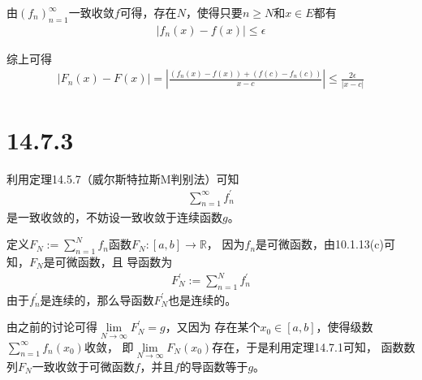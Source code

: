 \documentclass{article}
\begin{document}
由$(f_n)_{n = 1}^\infty$一致收敛$f$可得，存在$N$，使得只要$n \geq N$和$x \in E$都有
\begin{align*}
  |f_n(x) - f(x)| \leq \epsilon
\end{align*}

综上可得
\begin{align*}
 |F_n(x) - F(x)| = |\frac{(f_n(x) - f(x)) + (f(c) - f_n(c))}{x - c}| \leq \frac{2\epsilon}{|x - c|}  
\end{align*}


\section*{14.7.3}

利用定理14.5.7（威尔斯特拉斯M判别法）可知
\begin{align*}
  \sum \limits_{n = 1}^\infty f_n^\prime
\end{align*}
是一致收敛的，不妨设一致收敛于连续函数$g$。

定义$F_N := \sum\limits_{n = 1}^N f_n$函数$F_N: [a, b] \to \mathbb{R}$，
因为$f_n$是可微函数，由10.1.13(c)可知，$F_N$是可微函数，且
导函数为
\begin{align*}
  F_N^\prime := \sum\limits_{n = 1}^N f_n^\prime
\end{align*}
由于$f_n^\prime$是连续的，那么导函数$F_N^\prime$也是连续的。

由之前的讨论可得$\lim\limits_{N \to \infty} F_N^\prime = g$，又因为
存在某个$x_0 \in [a, b]$，使得级数$\sum\limits_{n = 1}^\infty f_n(x_0)$收敛，
即$\lim\limits_{N \to \infty} F_N(x_0)$存在，于是利用定理14.7.1可知，
函数数列$F_N$一致收敛于可微函数$f$，并且$f$的导函数等于$g$。
\end{document}
